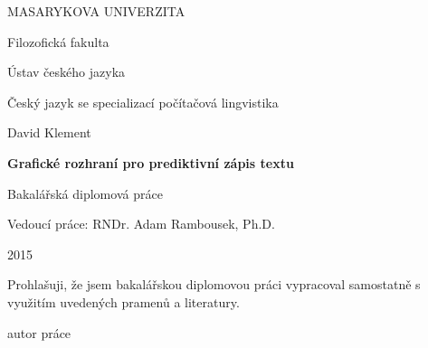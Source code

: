\documentclass[a4paper,11pt,openany]{book} %
\begin{document}
	\clearpage

	\begin{titlepage}
		\begin{center}
			{\Large\uppercase{Masarykova univerzita}}

			\vspace{1em}

			{\Large Filozofická fakulta}

			\vspace{1em}

			{\large Ústav českého jazyka}

			\vspace{1em}

			{\large Český jazyk se specializací počítačová lingvistika}

			\vspace{11em}

			{\large David Klement}
			
			\vspace{3em}
			
			{\LARGE\bf Grafické rozhraní pro prediktivní zápis textu}

			\vspace{1.5em}

			Bakalářská diplomová práce

			\vfill
			\vspace{3em}
			Vedoucí práce: RNDr. Adam Rambousek, Ph.D.
			
			2015
		\end{center}
	\end{titlepage}


	
\par
\par\vspace*{\fill}
	\pagestyle{plain}
\begin{flushright}
	Prohlašuji, že jsem bakalářskou diplomovou práci vypracoval samostatně s využitím uvedených pramenů a literatury.

	\vspace{3em}

	    \makebox[2.5in][r]{\dotfill}
	    
	    autor práce

	    \par

\end{flushright}
\clearpage

\par
\par\vspace*{\fill}
\end{document}
